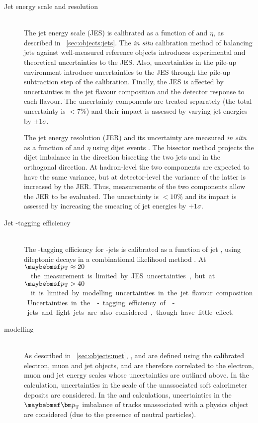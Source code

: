 \begin{description}
\item[Jet energy scale and resolution] \hfill \\
	The jet energy scale (JES) is calibrated as a function of \pt and $\eta$, as described 
	in \Section~\ref{sec:objects:jets}. The \textit{in situ} calibration method of balancing 
	jets against well-measured reference objects introduces experimental and theoretical 
	uncertainties to the JES. Also, uncertainties in the pile-up environment introduce 
	uncertainties to the JES through the pile-up subtraction step of the calibration. 
	Finally, the JES is affected by uncertainties in the jet flavour composition and the 
	detector response to each flavour. The uncertainty components are treated separately 
	(the total uncertainty is $<\!7\%$) and their impact is assessed by varying jet energies 
	by $\pm1\sigma$.

	The jet energy resolution (JER) and its uncertainty are measured \textit{in situ} as a 
	function of \pt and $\eta$ using dijet events \cite{Jets:JER:2011}. The bisector method 
	projects the dijet \pt imbalance in the direction bisecting the two jets and in the 
	orthogonal direction. At hadron-level the two components are expected to have the same 
	variance, but at detector-level the variance of the latter is increased by the JER.
	Thus, measurements of the two components allow the JER to be evaluated. The uncertainty 
	is $<\!10\%$ and its impact is assessed by increasing the smearing of jet energies 
	by $+1\sigma$.

\item[Jet \Pbottom-tagging efficiency] \hfill \\
	The \Pbottom-tagging efficiency for \Pbottom-jets is calibrated as a function of jet 
	\pt, using dileptonic \ttbar decays in a combinational likelihood method \cite{Btag:llh}.
	At \unit{$\pt \approx 20$}{\GeV} the measurement is limited by JES uncertainties, but at 
	\unit{$\pt > 40$}{\GeV} it is limited by modelling uncertainties in the jet flavour 
	composition. Uncertainties in the \Pbottom-tagging efficiency of \Pcharm-jets and light 
	jets are also considered, though have little effect.

\item[\met modelling] \hfill \\
	As described in \Section~\ref{sec:objects:met}, \calomet, \trackmet and \corrtrackmet 
	are defined using the calibrated electron, muon and jet objects, and are therefore 
	correlated to the electron, muon and jet energy scales whose uncertainties are outlined 
	above. In the \calomet calculation, uncertainties in the scale of the unassociated soft 
	calorimeter deposits are considered. In the \trackmet and \corrtrackmet calculations, 
	uncertainties in the $\bvec{p}_{\text{T}}$ imbalance of tracks unassociated with a 
	physics object are considered (\eg due to the presence of neutral particles).


\end{description}
